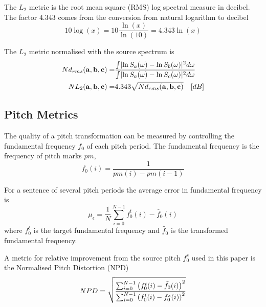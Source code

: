\begin{remark}
	The $L_2$ metric is the root mean square (RMS) log spectral measure in decibel. The factor $4.343$ comes from the conversion from natural logarithm to decibel
	\begin{equation}
		10\log(x) = 10 \frac{\ln(x)}{\ln(10)} = 4.343\ln(x) 
	\end{equation}	
\end{remark}

The $L_2$ metric normalised with the source spectrum is
\begin{equation}
	\begin{split}
	Nd_{rms}(\mathbf{a},\mathbf{b},\mathbf{c}) = & \frac{\int \lvert\ln S_a(\omega)-\ln S_b(\omega)\rvert^2 d\omega}{\int \lvert\ln S_a(\omega)-\ln S_c(\omega)\rvert^2 d\omega}  \\
	NL_2(\mathbf{a},\mathbf{b},\mathbf{c}) = & 4.343 \sqrt{Nd_{rms}(\mathbf{a},\mathbf{b},\mathbf{c})} \quad [dB]
	\end{split}
\end{equation}

\subsection{Pitch Metrics} %
\label{sub:pitch_metrics}
The quality of a pitch transformation can be measured by controlling the fundamental frequency $f_0$ of each pitch period. The fundamental frequency is the frequency of pitch marks $pm$, \ie 
\begin{equation}
	f_0(i) = \frac{1}{pm(i)-pm(i-1)}
\end{equation}

For a sentence of several pitch periods the average error in fundamental frequency is
\begin{equation}
	\mu_{\epsilon} = \frac{1}{N}\sum_{i=0}^{N-1} f_0^t(i) - \tilde{f_0}(i)
\end{equation}
where $f_0^t$ is the target fundamental frequency and $\tilde{f_0}$ is the transformed fundamental frequency.

A metric for relative improvement from the source pitch $f_0^s$ used in this paper is the Normalised Pitch Distortion (NPD) \cite{najjary04}
\begin{equation}
	NPD = \sqrt{\frac{\sum_{i=0}^{N-1} \left(f_0^t(i)-\tilde{f_0}(i)\right)^2}{\sum_{i=0}^{N-1} \left(f_0^t(i)-f_0^s(i)\right)^2}}
\end{equation}



